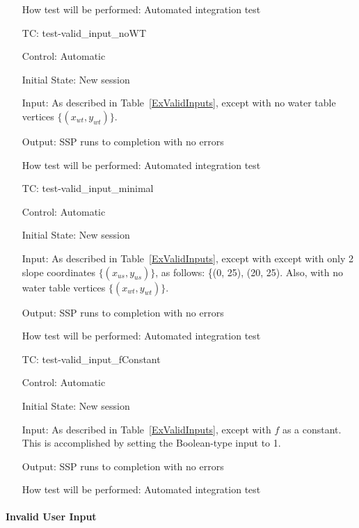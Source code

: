 \documentclass[12pt, titlepage]{article}
\newcounter{testnum} %
\newcommand{\progname}{SSP}
\begin{document}
\begin{enumerate}[label=TC\arabic*:,ref={\arabic*}]
How test will be performed: Automated integration test

\item [TC\refstepcounter{testnum}\thetestnum: \label{TC_ValidInNoWT}] 
test-valid\_input\_noWT

Control: Automatic

Initial State: New session

Input: As described in Table~\ref{ExValidInputs}, except with no water table 
vertices $\{\left(x_{wt},y_{wt}\right)\}$.

Output: \progname{} runs to completion with no errors

How test will be performed: Automated integration test

\item [TC\refstepcounter{testnum}\thetestnum: \label{TC_ValidInMin}] 
test-valid\_input\_minimal

Control: Automatic

Initial State: New session

Input: As described in Table~\ref{ExValidInputs}, except with  except with only 
2 slope coordinates $\{\left(x_{us},y_{us}\right)\}$, as follows: \{(0, 
25), (20, 25). Also, with no water table vertices 
$\{\left(x_{wt},y_{wt}\right)\}$.

Output: \progname{} runs to completion with no errors

How test will be performed: Automated integration test

\item [TC\refstepcounter{testnum}\thetestnum: \label{TC_ValidInConstant}] 
test-valid\_input\_fConstant

Control: Automatic

Initial State: New session

Input: As described in Table~\ref{ExValidInputs}, except with $f$ as a 
constant. This is accomplished by setting the Boolean-type input to 1.

Output: \progname{} runs to completion with no errors

How test will be performed: Automated integration test

\end{enumerate}

\paragraph{Invalid User Input}
\end{document}
